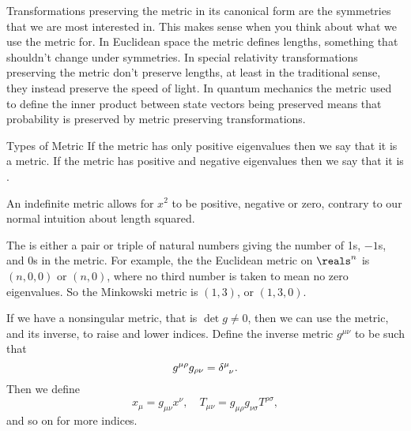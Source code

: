 \documentclass[fleqn]{NotesClass}
\begin{document}
    Transformations preserving the metric in its canonical form are the symmetries that we are most interested in.
    This makes sense when you think about what we use the metric for.
    In Euclidean space the metric defines lengths, something that shouldn't change under symmetries.
    In special relativity transformations preserving the metric don't preserve lengths, at least in the traditional sense, they instead preserve the speed of light.
    In quantum mechanics the metric used to define the inner product between state vectors being preserved means that probability is preserved by metric preserving transformations.
    
    \begin{dfn}{Types of Metric}{}
        If the metric has only positive eigenvalues then we say that it is a  metric.
        If the metric has positive and negative eigenvalues then we say that it is .
    \end{dfn}
    
    An indefinite metric allows for \(x^2\) to be positive, negative or zero, contrary to our normal intuition about length squared.
    
    The  is either a pair or triple of natural numbers giving the number of 1s, \(-1\)s, and 0s in the metric.
    For example, the the Euclidean metric on \(\reals^n\) is \((n, 0, 0)\) or \((n, 0)\), where no third number is taken to mean no zero eigenvalues.
    So the Minkowski metric is \((1, 3)\), or \((1, 3, 0)\).
    
    If we have a nonsingular metric, that is \(\det g \ne 0\), then we can use the metric, and its inverse, to raise and lower indices.
    Define the inverse metric \(g^{\mu\nu}\) to be such that
    \begin{equation}
        g^{\mu\rho}g_{\rho\nu} = \tensor{\delta}{^\mu_\nu}.
    \end{equation}
    Then we define
    \begin{equation}
        x_\mu = g_{\mu\nu}x^\nu, \quad T_{\mu\nu} = g_{\mu\rho}g_{\nu\sigma}T^{\rho\sigma},
    \end{equation}
    and so on for more indices.
    
\end{document}
